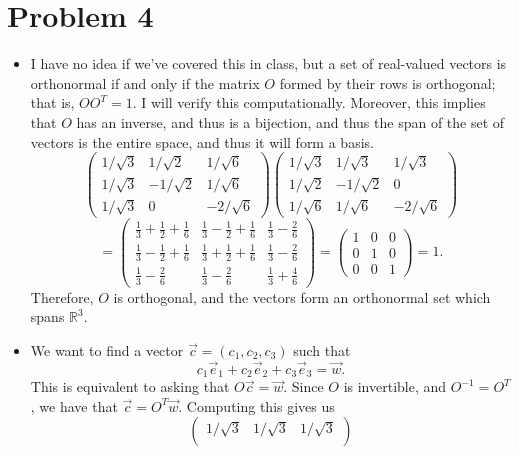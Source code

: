 \documentclass[11pt, letterpaper]{article}
\begin{document}
\section*{Problem 4}
\begin{itemize}
	\item I have no idea if we've covered this in class, but a set of real-valued vectors is orthonormal if and only if the matrix $O$ formed by their rows is orthogonal; that is, $OO^T=1$. I will verify this computationally. Moreover, this implies that $O$ has an inverse, and thus is a bijection, and thus the span of the set of vectors is the entire space, and thus it will form a basis.
		\[
			\begin{pmatrix}
			1/\sqrt{3}  & 1/\sqrt{2}  & 1/\sqrt{6}  \\
			1/\sqrt{3}  & -1/\sqrt{2}  & 1/\sqrt{6}  \\
			1/\sqrt{3}  & 0 & -2/\sqrt{6} 
			\end{pmatrix}\begin{pmatrix}
			1/\sqrt{3}  & 1/\sqrt{3}  & 1/\sqrt{3}  \\
			1/\sqrt{2}  & -1/\sqrt{2}  & 0  \\
			1/\sqrt{6}  & 1/\sqrt{6}  & -2/\sqrt{6} 
			\end{pmatrix}
		\]
		\[
			=\begin{pmatrix}
			\frac{1}{3} +\frac{1}{2} +\frac{1}{6}  & \frac{1}{3} -\frac{1}{2} +\frac{1}{6}  & \frac{1}{3} -\frac{2}{6}  \\
			\frac{1}{3} -\frac{1}{2} +\frac{1}{6}  & \frac{1}{3} +\frac{1}{2} +\frac{1}{6}  & \frac{1}{3} -\frac{2}{6}  \\
			\frac{1}{3} -\frac{2}{6}  & \frac{1}{3} -\frac{2}{6}  & \frac{1}{3} +\frac{4}{6} 
			\end{pmatrix}=\begin{pmatrix}
			1 & 0 & 0 \\
			0 & 1 & 0 \\
			0 & 0 & 1
			\end{pmatrix}=1
		.\]
		Therefore, $O$ is orthogonal, and the vectors form an orthonormal set which spans $\mathbb{R} ^3$.
	\item We want to find a vector $\vec{c} =(c_1,c_2,c_3)$ such that
		\[
			c_1 \vec{e}_1 + c_2 \vec{e} _2 + c_3 \vec{e} _3= \vec{w} 
		.\]
		This is equivalent to asking that $O \vec{c} =\vec{w} $. Since $O$ is invertible, and $O^{-1} =O^T$, we have that $\vec{c} =O^T \vec{w} $. Computing this gives us
		\[
\begin{pmatrix}
			1/\sqrt{3}  & 1/\sqrt{3}  & 1/\sqrt{3}  \\

\end{pmatrix}\]
\end{itemize}
\end{document}
